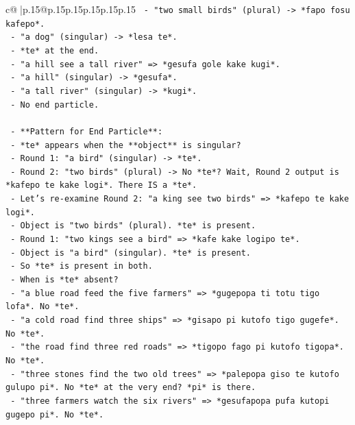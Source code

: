 \documentclass{article}
\begin{document}
{\begin{supertabular}{c@{$\;$}|p{.15\linewidth}@{}p{.15\linewidth}p{.15\linewidth}p{.15\linewidth}p{.15\linewidth}p{.15\linewidth}}
{{{\texttt{                  {-} "two small birds" (plural) {-}> *fapo fosu kafepo*.} \\
\texttt{                  {-} "a dog" (singular) {-}> *lesa te*.} \\
\texttt{                  {-} *te* at the end.} \\
\texttt{                {-} "a hill see a tall river" => *gesufa gole kake kugi*.} \\
\texttt{                  {-} "a hill" (singular) {-}> *gesufa*.} \\
\texttt{                  {-} "a tall river" (singular) {-}> *kugi*.} \\
\texttt{                  {-} No end particle.} \\
\\ 
\texttt{    {-} **Pattern for End Particle**:} \\
\texttt{      {-} *te* appears when the **object** is singular?} \\
\texttt{        {-} Round 1: "a bird" (singular) {-}> *te*.} \\
\texttt{        {-} Round 2: "two birds" (plural) {-}> No *te*? Wait, Round 2 output is *kafepo te kake logi*. There IS a *te*.} \\
\texttt{        {-} Let's re{-}examine Round 2: "a king see two birds" => *kafepo te kake logi*.} \\
\texttt{          {-} Object is "two birds" (plural). *te* is present.} \\
\texttt{        {-} Round 1: "two kings see a bird" => *kafe kake logipo te*.} \\
\texttt{          {-} Object is "a bird" (singular). *te* is present.} \\
\texttt{        {-} So *te* is present in both.} \\
\texttt{        {-} When is *te* absent?} \\
\texttt{          {-} "a blue road feed the five farmers" => *gugepopa ti totu tigo lofa*. No *te*.} \\
\texttt{          {-} "a cold road find three ships" => *gisapo pi kutofo tigo gugefe*. No *te*.} \\
\texttt{          {-} "the road find three red roads" => *tigopo fago pi kutofo tigopa*. No *te*.} \\
\texttt{          {-} "three stones find the two old trees" => *palepopa giso te kutofo gulupo pi*. No *te* at the very end? *pi* is there.} \\
\texttt{          {-} "three farmers watch the six rivers" => *gesufapopa pufa kutopi gugepo pi*. No *te*.} \\
}}}
\end{supertabular}}
\end{document}
